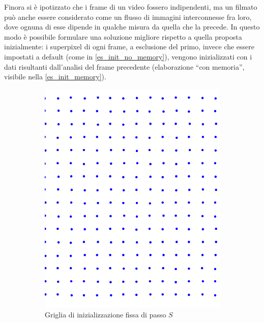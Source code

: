 \documentclass[12pt,a4paper,oneside]{article}
\begin{document}
\noindent Finora si è ipotizzato che i frame di un video fossero indipendenti, ma un filmato può anche essere considerato come un flusso di immagini interconnesse fra loro, dove ognuna di esse dipende in qualche misura da quella che la precede. In questo modo è possibile formulare una soluzione migliore rispetto a quella proposta inizialmente: i superpixel di ogni frame, a esclusione del primo, invece che essere impostati a default (come in \cref{es_init_no_memory}), vengono inizializzati con i dati risultanti dall'analisi del frame precedente (elaborazione ``con memoria'', visibile nella \cref{es_init_memory}).
\begin{figure}[!htb]	
	\centering
	\begin{subfigure}[t]{.325\textwidth}
		\includegraphics[width=\textwidth]{resources/images/mascheraIntermedia_no_memory.png}
		\captionsetup{justification=centering}
		\caption{Griglia di inizializzazione fissa di passo $S$}	
	\end{subfigure}%
	\hfill
	\begin{subfigure}[t]{.325\textwidth}

\end{subfigure}
\end{figure}
\end{document}
